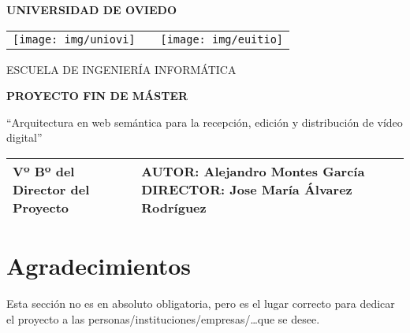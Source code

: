 \documentclass[11pt]{book}
\begin{document}

\thispagestyle{empty}

\begin{center}
\LARGE
\textbf{UNIVERSIDAD DE OVIEDO}


\vspace{1.5cm}
\begin{tabular*}{5in}{c c c}
\texttt{[image: img/uniovi]} & \hspace{1.75in} & 
\texttt{[image: img/euitio]} \\
\end{tabular*}
\end{center}

\vspace{72pt}

\begin{center}
\LARGE
ESCUELA DE INGENIERÍA INFORMÁTICA

\vspace{72pt}

\textbf{PROYECTO FIN DE MÁSTER}

\vspace{72pt}

\noindent ``Arquitectura en web semántica para la recepción, edición y distribución de vídeo digital''

\vspace{104pt}

\normalsize

\begin{tabular}{|p{2.5in}|p{2.5in}|} 
\hline 
\textbf{\vspace{2cm} Vº Bº  del Director del Proyecto} & 
\textbf{AUTOR:} Alejandro Montes García \vspace{1cm} \newline \textbf{DIRECTOR:} Jose María Álvarez Rodríguez \vspace{1cm} \\ 
\hline 
\end{tabular}

\end{center}

\newpage
\thispagestyle{empty}
\mbox{}

\newpage
\thispagestyle{empty}

\section*{Agradecimientos}

\noindent Esta sección no es en absoluto obligatoria, pero es el lugar correcto para dedicar el proyecto a las personas/instituciones/empresas/\dots  que se desee.
\end{document}
